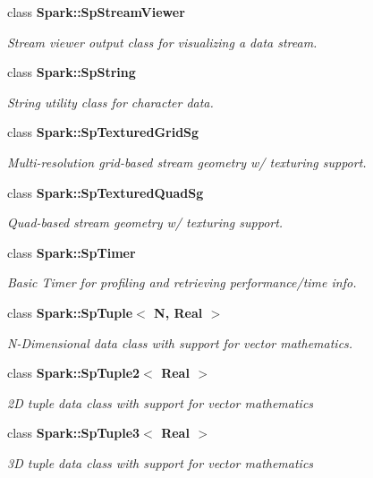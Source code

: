 \begin{CompactItemize}
class {\bf Spark::Sp\-Stream\-Viewer}
\begin{CompactList}\small\item\em Stream viewer output class for visualizing a data stream. \item\end{CompactList}\item 
class {\bf Spark::Sp\-String}
\begin{CompactList}\small\item\em String utility class for character data. \item\end{CompactList}\item 
class {\bf Spark::Sp\-Textured\-Grid\-Sg}
\begin{CompactList}\small\item\em Multi-resolution grid-based stream geometry w/ texturing support. \item\end{CompactList}\item 
class {\bf Spark::Sp\-Textured\-Quad\-Sg}
\begin{CompactList}\small\item\em Quad-based stream geometry w/ texturing support. \item\end{CompactList}\item 
class {\bf Spark::Sp\-Timer}
\begin{CompactList}\small\item\em Basic Timer for profiling and retrieving performance/time info. \item\end{CompactList}\item 
class {\bf Spark::Sp\-Tuple$<$ N, Real $>$}
\begin{CompactList}\small\item\em N-Dimensional data class with support for vector mathematics. \item\end{CompactList}\item 
class {\bf Spark::Sp\-Tuple2$<$ Real $>$}
\begin{CompactList}\small\item\em 2D tuple data class with support for vector mathematics \item\end{CompactList}\item 
class {\bf Spark::Sp\-Tuple3$<$ Real $>$}
\begin{CompactList}\small\item\em 3D tuple data class with support for vector mathematics \item\end{CompactList}\item 

\end{CompactItemize}
